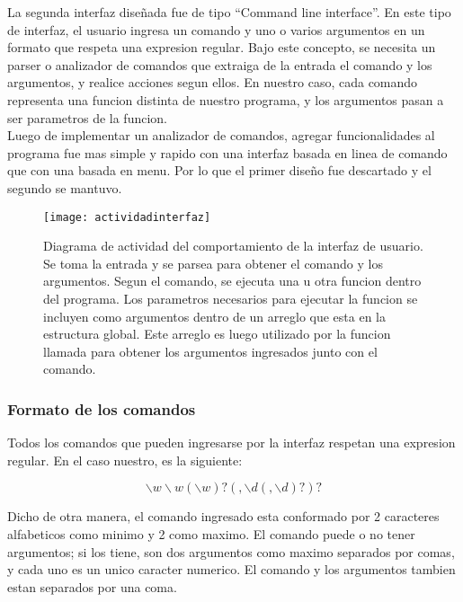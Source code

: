 La segunda interfaz diseñada fue de tipo ``Command line interface''. En este tipo de interfaz, el usuario ingresa un comando y uno o varios argumentos en un formato que respeta una expresion regular. Bajo este concepto, se necesita un parser o analizador de comandos que extraiga de la entrada el comando y los argumentos, y realice acciones segun ellos. En nuestro caso, cada comando representa una funcion distinta de nuestro programa, y los argumentos pasan a ser parametros de la funcion. \\

Luego de implementar un analizador de comandos, agregar funcionalidades al programa fue mas simple y rapido con una interfaz basada en linea de comando que con una basada en menu. Por lo que el primer diseño fue descartado y el segundo se mantuvo. \\

\begin{figure}[h]
  \centering
  \texttt{[image: actividadinterfaz]}
  \caption[Diagrama de actividad del comportamiento de la interfaz de usuario]{Diagrama de actividad del comportamiento de la interfaz de usuario. Se toma la entrada y se parsea para obtener el comando y los argumentos. Segun el comando, se ejecuta una u otra funcion dentro del programa. Los parametros necesarios para ejecutar la funcion se incluyen como argumentos dentro de un arreglo que esta en la estructura global. Este arreglo es luego utilizado por la funcion llamada para obtener los argumentos ingresados junto con el comando.}\label{fig:actividadinterfaz}
\end{figure}

\subsubsection{Formato de los comandos} %
\label{it2:ssub:formato_de_los_comandos}

Todos los comandos que pueden ingresarse por la interfaz respetan una expresion regular. En el caso nuestro, es la siguiente:

\begin{equation}
\backslash w\backslash w(\backslash w)?(,\backslash d(,\backslash d)?)?
\end{equation}

Dicho de otra manera, el comando ingresado esta conformado por 2 caracteres alfabeticos como minimo y 2 como maximo. El comando puede o no tener argumentos; si los tiene, son dos argumentos como maximo separados por comas, y cada uno es un unico caracter numerico. El comando y los argumentos tambien estan separados por una coma.

